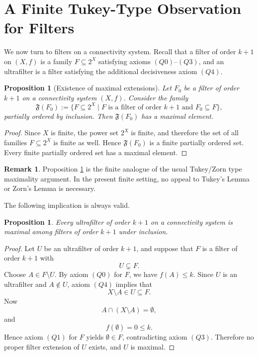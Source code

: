 \documentclass[10pt]{book}
\newtheorem{proposition}[theorem]{Proposition}
\theoremstyle{definition}
\newtheorem{remark}[theorem]{Remark}
\begin{document}
\section{A Finite Tukey-Type Observation for Filters}

We now turn to filters on a connectivity system.
Recall that a filter of order \(k+1\) on \((X,f)\) is a family
\(F\subseteq 2^X\) satisfying axioms \((Q0)\)--\((Q3)\), and an ultrafilter is a filter satisfying the additional decisiveness axiom \((Q4)\).

\begin{proposition}[Existence of maximal extensions]
\label{prop:maximal-filter-exists}
Let \(F_0\) be a filter of order \(k+1\) on a connectivity system \((X,f)\).
Consider the family
\[
\mathfrak{F}(F_0):=
\{F \subseteq 2^X \mid F \text{ is a filter of order } k+1 \text{ and } F_0\subseteq F\},
\]
partially ordered by inclusion.
Then \(\mathfrak{F}(F_0)\) has a maximal element.
\end{proposition}

\begin{proof}
Since \(X\) is finite, the power set \(2^X\) is finite, and therefore the set of all families \(F\subseteq 2^X\) is finite as well.
Hence \(\mathfrak{F}(F_0)\) is a finite partially ordered set.
Every finite partially ordered set has a maximal element.
\end{proof}

\begin{remark}
Proposition \ref{prop:maximal-filter-exists} is the finite analogue of the usual Tukey/Zorn type maximality argument.
In the present finite setting, no appeal to Tukey's Lemma or Zorn's Lemma is necessary.
\end{remark}

The following implication is always valid.

\begin{proposition}
\label{prop:ultrafilter-maximal-filter}
Every ultrafilter of order \(k+1\) on a connectivity system is maximal among filters of order \(k+1\) under inclusion.
\end{proposition}

\begin{proof}
Let \(U\) be an ultrafilter of order \(k+1\), and suppose that \(F\) is a filter of order \(k+1\) with
\[
U \subsetneq F.
\]
Choose \(A\in F\setminus U\).
By axiom \((Q0)\) for \(F\), we have \(f(A)\leq k\).
Since \(U\) is an ultrafilter and \(A\notin U\), axiom \((Q4)\) implies that
\[
X\setminus A \in U \subseteq F.
\]
Now
\[
A\cap (X\setminus A)=\emptyset,
\]
and
\[
f(\emptyset)=0\leq k.
\]
Hence axiom \((Q1)\) for \(F\) yields \(\emptyset\in F\), contradicting axiom \((Q3)\).
Therefore no proper filter extension of \(U\) exists, and \(U\) is maximal.
\end{proof}
\end{document}
